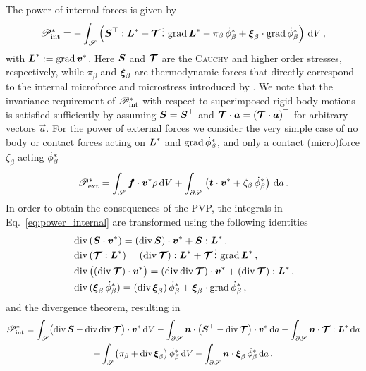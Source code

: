 \documentclass[preprint,review,3p,times,authoryear]{elsarticle}
\begin{document}
The power of internal forces is given by
\begin{equation}
  \label{eq:power_internal}
  \scP^{*}_{\internal} = - \int_{\scS} \left( \tS^{\top}:\tL^{*} + \ttT \tridot \grad{\tL^{*}} - \pi_{\beta}\,\vopv_{\beta} + \vxi_{\beta}\cdot\grad{\vopv_{\beta}} \right) \dV\,,
\end{equation}
with $\boldsymbol{L}^{*}:=\operatorname*{grad}{\boldsymbol{v}^{*}}$. Here $\boldsymbol{S}$ and $\boldsymbol{\mathcal{T}}$ are the \textsc{Cauchy} and higher order stresses, respectively, while $\pi_{\beta}$ and $\boldsymbol{\xi}_{\beta}$ are thermodynamic forces that directly correspond to the internal microforce and microstress introduced by \citet{Gurtin:1996vn}. We note that the invariance requirement of $\mathscr{P}^{*}_{\text{int}}$ with respect to superimposed rigid body motions is satisfied sufficiently by assuming $\boldsymbol{S} = \boldsymbol{S}^{\top}$ and $\boldsymbol{\mathcal{T}}\cdot\boldsymbol{a} = (\boldsymbol{\mathcal{T}}\cdot\boldsymbol{a})^{\top}$ for arbitrary vectors $\vec{a}$. For the power of external forces we consider the very simple case of no body or contact forces acting on $\boldsymbol{L}^{*}$ and $\grad{\vopv_{\beta}}$, and only a contact (micro)force $\zeta_{\beta}$ acting $\vopv_{\beta}$
\begin{equation}
  \label{eq:power_external}
  \scP^{*}_{\ext} = \int_{\scS} \vf \cdot \vv^{*} \rho \dV + \int_{\partial\scS}\left( \vt \cdot \vv^{*} + \zeta_{\beta}\,\vopv_{\beta} \right)\dA\,.
\end{equation}
%
In order to obtain the consequences of the PVP, the integrals in Eq.~\eqref{eq:power_internal} are transformed using the following identities 
\begin{align}
  &\diver{(\tS\cdot\vv^{*})} = (\diver{\tS})\cdot\vv^{*} + \tS:\tL^{*}\,, \\
  &\diver{(\ttT:\tL^{*})} = (\diver{\ttT}):\tL^{*} + \ttT\tridot\grad{\tL^{*}}\,, \\
  &\diver{\bigl((\diver{\ttT})\cdot\vv^{*}\bigr)} = (\diver{\diver{\ttT}})\cdot\vv^{*} + (\diver{\ttT}):\tL^{*}\,, \\
  &\diver{(\vxi_{\beta}\,\vopv_{\beta})} = (\diver{\vxi_{\beta}})\,\vopv_{\beta} + \vxi_{\beta}\cdot\grad{\vopv_{\beta}}\,,
\end{align}
and the divergence theorem, resulting in
\begin{multline}
  \label{eq:power_internal_1}
  \scP^{*}_{\internal} =  \int_{\scS} \bigl( \diver{\tS} - \diver{\diver{\ttT}}\bigr)\cdot\vv^{*}\dV - \int_{\partial\scS}\vn\cdot\bigl(\tS^{\top} - \diver{\ttT}\bigr)\cdot\vv^{*}\dA - \int_{\partial\scS}\vn\cdot\ttT:\tL^{*}\dA \\
+ \int_{\scS} \bigl( \pi_{\beta} + \diver{\vxi_{\beta}} \bigr)\,\vopv_{\beta} \dV - \int_{\partial\scS}\vn\cdot\vxi_{\beta}\,\vopv_{\beta}\dA\,.
\end{multline}
\end{document}
